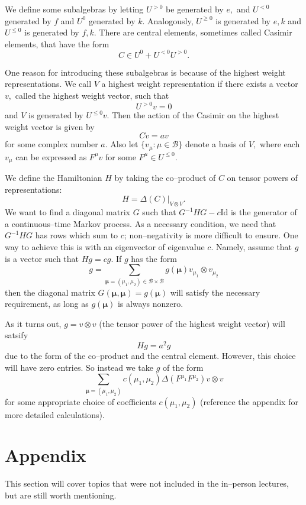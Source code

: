 \documentclass{ximera}
\begin{document}
We define some subalgebras by letting $U^{> 0}$ be generated by $e,$ and $U^{<0}$ generated by $f$ and
$U^0$ generated by $k$. Analogously, $U^{\geq 0}$ is generated by $e,k$ and $U^{\leq 0}$ is generated
by $f,k$. There are central elements, sometimes called Casimir elements, that have the form
$$
C \in U^0 + U^{< 0}U^{> 0}.
$$

One reason for introducing these subalgebras is because of the highest weight representations. We call $V$ a 
highest weight representation if there exists a vector $v,$ called the highest weight vector, such that
$$
U^{>0}v=0
$$
and $V$ is generated by $U^{\leq 0}v.$ Then the action of the Casimir on the highest weight vector is given by
$$
Cv = av
$$
for some complex number $a.$ Also let $\{v_{\mu}:\mu \in\mathcal{B}\}$ denote a basis of $V,$ where each $v_{\mu}$
can be expressed as $F^{\mu}v$ for some $F^{\mu} \in U^{\leq 0}.$

We define the Hamiltonian $H$ by taking the co--product of $C$ on tensor powers of representations: 
$$
H = \Delta(C) \vert_{V \otimes V}.
$$
We want to find a diagonal matrix $G$ such that $G^{-1}HG-c\mathrm{Id}$ is the generator of a continuous--time
Markov process. As a necessary condition, we need that $G^{-1}HG$ has rows which sum to $c$; non--negativity is more
difficult to ensure. One way to achieve this is with an eigenvector of eigenvalue $c$. Namely, assume that 
$g$ is a vector such that $Hg=cg.$ If $g$ has the form
$$
g=\sum_{\boldsymbol{\mu}=(\mu_1,\mu_2)\in \mathcal{B}\times \mathcal{B}} g(\boldsymbol{\mu}) v_{\mu_1}\otimes v_{\mu_2} 
$$
then the diagonal matrix $G(\boldsymbol{\mu},\boldsymbol{\mu})=g(\boldsymbol{\mu})$ will satisfy the necessary requirement, 
as long as $g(\boldsymbol{\mu})$ is always nonzero.

As it turns out, $g=v\otimes v$ (the tensor power of the highest weight vector) will satsify 
$$
Hg=a^2g
$$
due to the form of the co--product and the central element. However, this choice will have zero entries. So instead we
take $g$ of the form
$$
\sum_{\boldsymbol{\mu}=(\mu_1,\mu_2)} c(\mu_1,\mu_2)\Delta(F^{\mu_1}F^{\mu_2}) v\otimes v
$$
for some appropriate choice of coefficients $c(\mu_1,\mu_2)$ (reference the appendix for more detailed calculations).

\section{Appendix}

This section will cover topics that were not included in the in--person lectures, but are still worth mentioning.
\end{document}
